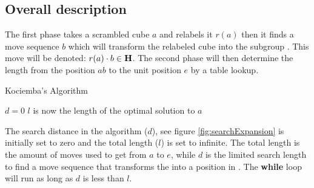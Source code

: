 \subsection{Overall description}
\label{sub:overallDescription}
The first phase takes a scrambled cube $a$ and relabels it $r(a)$ then it finds a move sequence $b$ which will transform the relabeled cube into the subgroup . This move will be denoted: $r(a)\cdot{}b \in \textbf{H}$. The second phase will then determine the length from the position $ab$ to the unit position $e$ by a table lookup. 


\begin{algorithm}[!h]                     
\caption{Kociemba's Algorithm \cite{rokicki09}}          
\label{alg:kociemba}        
\begin{algorithmic}[1]
\STATE $d=0$
			\ENDIF
		\ENDIF
	\ENDFOR
\ENDWHILE
\STATE $l$ is now the length of the optimal solution to $a$
\end{algorithmic}
\end{algorithm}

The search distance in the algorithm ($d$), see figure \ref{fig:searchExpansion} is initially set to zero and the total length ($l$) is set to infinite. The total length is the amount of moves used to get from $a$ to $e$, while $d$ is the limited search length to find a move sequence that transforms the \rubik{} into a position in . 
The \textbf{while} loop will run as long as $d$ is less than $l$.

